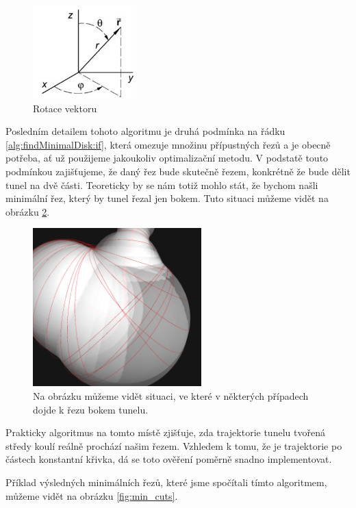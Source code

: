 \begin{figure}[ht]
    \centering
    \includegraphics[width=40mm]{img/vector_rotate.jpg}
    \caption{Rotace vektoru}
  \centering
  \label{fig:vector_rotate}
\end{figure}

Posledním detailem tohoto algoritmu je druhá podmínka na řádku \ref{alg:findMinimalDisk:if},
která omezuje množinu přípustných řezů a je obecně potřeba, ať už použijeme
jakoukoliv optimalizační metodu. V podstatě touto podmínkou zajišťujeme, že daný řez
bude skutečně řezem, konkrétně že bude dělit tunel na dvě části. Teoreticky by se nám
totiž mohlo stát, že bychom našli minimální řez, který by tunel řezal jen bokem.
Tuto situaci můžeme vidět na obrázku \ref{fig:side_cut}.

\begin{figure}[ht]
    \centering
    \includegraphics[width=65mm]{img/side_cut.png}
    \caption{Na obrázku můžeme vidět situaci, ve které v některých případech dojde
        k řezu bokem tunelu.}
  \centering
  \label{fig:side_cut}
\end{figure}

Prakticky algoritmus na tomto místě zjišťuje, zda trajektorie tunelu tvořená středy
koulí reálně prochází našim řezem. Vzhledem k tomu, že je trajektorie po částech
konstantní křivka, dá se toto ověření poměrně snadno implementovat.

Příklad výsledných minimálních řezů, které jsme spočítali tímto algoritmem,
můžeme vidět na obrázku \ref{fig:min_cuts}.

